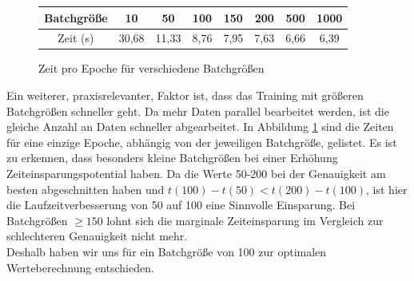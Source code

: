 \begin{figure}[H]
	\centering
	\begin{tabular}{|c|c|c|c|c|c|c|c|}\hline
		Batchgröße&10&50&100&150&200&500&1000\\\hline
		Zeit (s)&30,68&11,33&8,76&7,95&7,63&6,66&6,39\\\hline
	\end{tabular}
	\caption{Zeit pro Epoche für verschiedene Batchgrößen }
	\label{fig:batchsize_time}
\end{figure}
Ein weiterer, praxisrelevanter, Faktor ist, dass das Training mit größeren Batchgrößen schneller geht. Da mehr Daten parallel bearbeitet werden, ist die gleiche Anzahl an Daten schneller abgearbeitet. In Abbildung \ref{fig:batchsize_time} sind die Zeiten für eine einzige Epoche, abhängig von der jeweiligen Batchgröße, gelistet. Es ist zu erkennen, dass besonders kleine Batchgrößen bei einer Erhöhung Zeiteinsparungspotential haben. Da die Werte 50-200 bei der Genauigkeit am besten abgeschnitten haben und $t(100)-t(50) <t(200)-t(100)$, ist hier die Laufzeitverbesserung von 50 auf 100 eine Sinnvolle Einsparung. Bei Batchgrößen $\geq 150$ lohnt sich die marginale Zeiteinsparung im Vergleich zur schlechteren Genauigkeit nicht mehr.\\
Deshalb haben wir uns für ein Batchgröße von 100 zur optimalen Werteberechnung entschieden.

